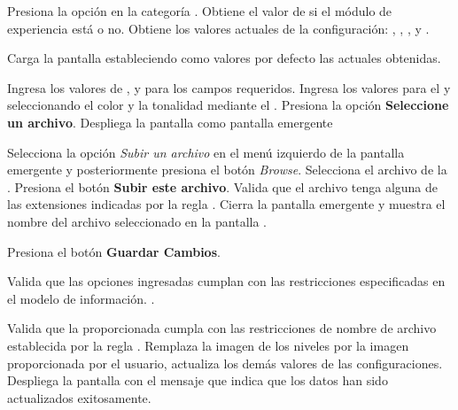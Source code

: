 \begin{UCtrayectoria}%
   

  \Actor Presiona la opción {\bf {}} en la categoría
         .
  \Sistema Obtiene el valor de si el módulo de experiencia está  o no. 
  \Sistema Obtiene los valores actuales de la configuración:
           ,
           ,
           ,
            y
           .

  \Sistema Carga la pantalla  estableciendo como valores por defecto
           las  actuales obtenidas.

  \Actor Ingresa los valores de ,
          y
          para los campos requeridos.
         \label{CU-E02-1.formulario}
  \Actor Ingresa los valores para el  y
          seleccionando el color y la
         tonalidad mediante el . 
         \label{CU-E02-1.color}
  \Actor Presiona la opción {\bf Seleccione un archivo}. 
  \Sistema Despliega la pantalla  como pantalla emergente
           \label{CU-E02-1.seleccion-archivo}

  \Actor Selecciona la opción {\it Subir un archivo} en el menú izquierdo de la
         pantalla emergente y posteriormente presiona el botón {\it Browse}.
  \Actor Selecciona el archivo de la .
  \Actor Presiona el botón {\bf Subir este archivo}.
  \Sistema Valida que el archivo tenga alguna de las extensiones indicadas
           por la regla . 
  \Sistema Cierra la pantalla emergente y muestra el nombre del archivo seleccionado
           en la pantalla .


  \Actor Presiona el botón {\bf Guardar Cambios}.  \label{CU-E02-1.validacion}

  \Sistema Valida que las opciones ingresadas cumplan con las restricciones
           especificadas en el modelo de información. .

  \Sistema Valida que la  proporcionada cumpla con
           las restricciones de nombre de archivo establecida por la regla
           . 
  \Sistema Remplaza la imagen de los niveles por la imagen proporcionada por el usuario,
           actualiza los demás valores de las configuraciones. 
  \Sistema Despliega la pantalla  con el mensaje que indica que
           los datos han sido actualizados exitosamente.
\end{UCtrayectoria}

